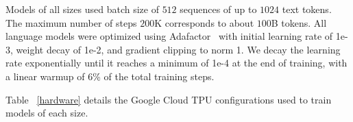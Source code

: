 Models of all sizes used batch size of $512$ sequences of up to $1024$ text tokens. The maximum number of steps $200$K corresponds to about $100$B tokens. All language models were optimized using Adafactor~\cite{adafactor} with initial learning rate of 1e-3, weight decay of 1e-2, and gradient clipping to norm 1. We decay the learning rate exponentially until it reaches a minimum of 1e-4 at the end of training, with a linear
warmup of 6\% of the total training steps.

Table ~\ref{hardware} details the Google Cloud TPU configurations used to train models of each size.


\begin{table}[htbp]
\begin{center}
\begin{small}
\begin{sc}
\end{sc}
\end{small}
\end{center}
\caption{Architecture details for models used in our experiments. All models use the same vocabulary with a size of $256{,}000$.}
\label{model-sizes}
\end{table}



